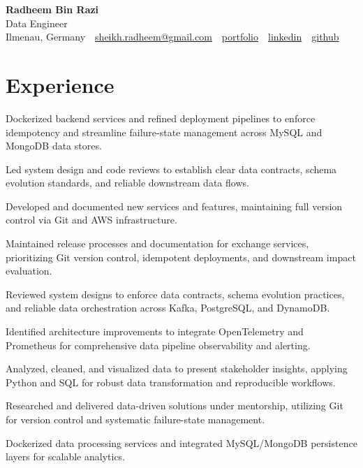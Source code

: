 \documentclass[11pt,a4paper]{resume}
\makeatletter
\newcommand{\Portfolio}{https://radheem.github.io/my-cv}
\newcommand{\PortfolioText}{portfolio}
\newcommand{\GitHub}{https://github.com/radheem}
\newcommand{\LinkedIn}{https://www.linkedin.com/in/radheem-razi}
\newcommand{\Email}{sheikh.radheem@gmail.com}
\makeatother
\begin{document}
\begin{center}
  {\huge\bfseries Radheem Bin Razi}\\[3pt]
  {\large Data Engineer}\\[6pt]
  \small
  Ilmenau, Germany \,\textbar\,
  \href{mailto:\Email}{\Email} \,\textbar\,
  \href{\Portfolio}{\PortfolioText} \,\textbar\,
  \href{\LinkedIn}{linkedin} \,\textbar\,
  \href{\GitHub}{github}
\end{center}
\vspace{2pt}

\section{Experience}

\bullets
  \item Dockerized backend services and refined deployment pipelines to enforce idempotency and streamline failure-state management across MySQL and MongoDB data stores.
  \item Led system design and code reviews to establish clear data contracts, schema evolution standards, and reliable downstream data flows.
  \item Developed and documented new services and features, maintaining full version control via Git and AWS infrastructure.
\bulletsend
\vspace{3pt}
\bullets
  \item Maintained release processes and documentation for exchange services, prioritizing Git version control, idempotent deployments, and downstream impact evaluation.
  \item Reviewed system designs to enforce data contracts, schema evolution practices, and reliable data orchestration across Kafka, PostgreSQL, and DynamoDB.
  \item Identified architecture improvements to integrate OpenTelemetry and Prometheus for comprehensive data pipeline observability and alerting.
\bulletsend
\vspace{3pt}
\bullets
  \item Analyzed, cleaned, and visualized data to present stakeholder insights, applying Python and SQL for robust data transformation and reproducible workflows.
  \item Researched and delivered data-driven solutions under mentorship, utilizing Git for version control and systematic failure-state management.
  \item Dockerized data processing services and integrated MySQL/MongoDB persistence layers for scalable analytics.
\bulletsend
\vspace{3pt}
\end{document}
